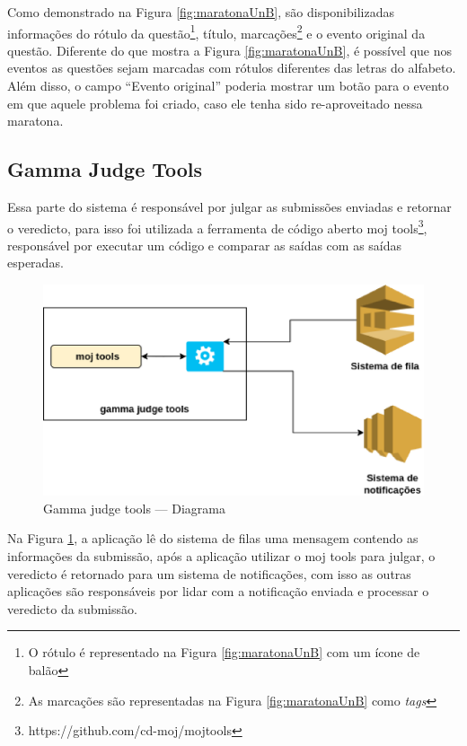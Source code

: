 Como demonstrado na Figura \ref{fig:maratonaUnB}, são disponibilizadas informações do rótulo da questão\footnote{O rótulo é representado na Figura \ref{fig:maratonaUnB} com um ícone de balão}, título, marcações\footnote{As marcações são representadas na Figura \ref{fig:maratonaUnB} como \textit{tags}} e o evento original da questão. Diferente do que mostra a Figura \ref{fig:maratonaUnB}, é possível que nos eventos as questões sejam marcadas com rótulos diferentes das letras do alfabeto. Além disso, o campo ``Evento original'' poderia mostrar um botão para o evento em que aquele problema foi criado, caso ele tenha sido re-aproveitado nessa maratona.

\subsection{Gamma Judge Tools}
\label{sec:gamaJudgeTools}

Essa parte do sistema é responsável por julgar as submissões enviadas e retornar o veredicto, para isso foi utilizada a ferramenta de código aberto moj tools\footnote{https://github.com/cd-moj/mojtools}, responsável por executar um código e comparar as saídas com as saídas esperadas.

\begin{figure}[H]
    \centering
    \includegraphics[keepaspectratio=true,scale=0.5]{figuras/gamma_judge_tools_diagram.eps}
    \caption{Gamma judge tools — Diagrama}
    \label{fig:judge_tools_diagram}
\end{figure}

Na Figura \ref{fig:judge_tools_diagram}, a aplicação lê do sistema de filas uma mensagem contendo as informações da submissão, após a aplicação utilizar o moj tools para julgar, o veredicto é retornado para um sistema de notificações, com isso as outras aplicações são responsáveis por lidar com a notificação enviada e processar o veredicto da submissão. 

